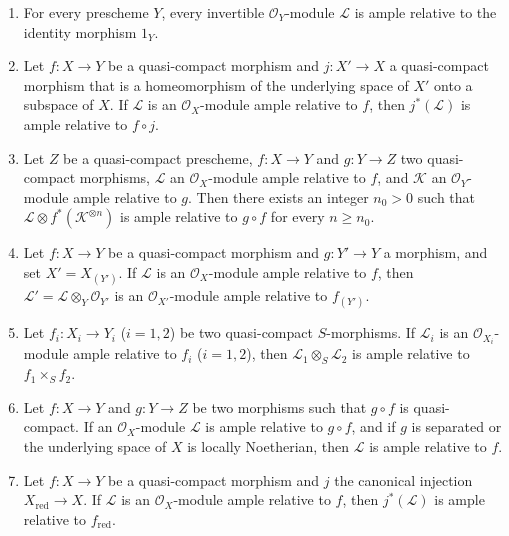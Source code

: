 \begin{proposition}[4.6.13]
\label{II.4.6.13}
\begin{enumerate}
  \item[\rm{(i)}] For every prescheme $Y$, every invertible
  $\mathcal{O}_Y$-module $\mathcal{L}$ is ample relative
  to the identity morphism $1_Y$.
  \item[\rm{(i bis)}] Let $f:X\to Y$ be a quasi-compact morphism and
  $j:X'\to X$ a quasi-compact morphism that is a homeomorphism of
  the underlying space of $X'$ onto a subspace of $X$. If $\mathcal{L}$
  is an $\mathcal{O}_X$-module ample relative to $f$, then
  $j^*(\mathcal{L})$ is ample relative to $f\circ j$.
  \item[\rm{(ii)}] Let $Z$ be a quasi-compact prescheme, $f:X\to Y$ and
  $g:Y\to Z$ two quasi-compact morphisms, $\mathcal{L}$ an
  $\mathcal{O}_X$-module ample relative to $f$, and $\mathcal{K}$ an
  $\mathcal{O}_Y$-module ample relative to $g$. Then there exists an
  integer $n_0>0$ such that
  $\mathcal{L}\otimes f^*(\mathcal{K}^{\otimes n})$ is ample relative
  to $g\circ f$ for every $n\geq n_0$.
  \item[\rm{(iii)}] Let $f:X\to Y$ be a quasi-compact morphism and
  $g:Y'\to Y$ a morphism, and set $X'=X_{(Y')}$. If $\mathcal{L}$ is
  an $\mathcal{O}_X$-module ample relative to $f$, then
  $\mathcal{L}'=\mathcal{L}\otimes_Y\mathcal{O}_{Y'}$ is an
  $\mathcal{O}_{X'}$-module ample relative to $f_{(Y')}$.
  \item[\rm{(iv)}] Let $f_i:X_i\to Y_i$ ($i=1,2$) be two quasi-compact
  $S$-morphisms. If $\mathcal{L}_i$ is an
  $\mathcal{O}_{X_i}$-module ample relative to $f_i$ ($i=1,2$), then
  $\mathcal{L}_1\otimes_S\mathcal{L}_2$ is ample relative to
  $f_1\times_S f_2$.
  \item[\rm{(v)}] Let $f:X\to Y$ and $g:Y\to Z$ be two morphisms such that
  $g\circ f$ is quasi-compact. If an $\mathcal{O}_X$-module
  $\mathcal{L}$ is ample relative to $g\circ f$, and if $g$ is separated
  or the underlying space of $X$ is locally Noetherian, then $\mathcal{L}$
  is ample relative to $f$.


  \item[\rm{(vi)}] Let $f:X\to Y$ be a quasi-compact morphism and $j$
  the canonical injection $X_{\mathrm{red}}\to X$. If $\mathcal{L}$ is an
  $\mathcal{O}_X$-module ample relative to $f$, then
  $j^*(\mathcal{L})$ is ample relative to $f_{\mathrm{red}}$.
\end{enumerate}
\end{proposition}

